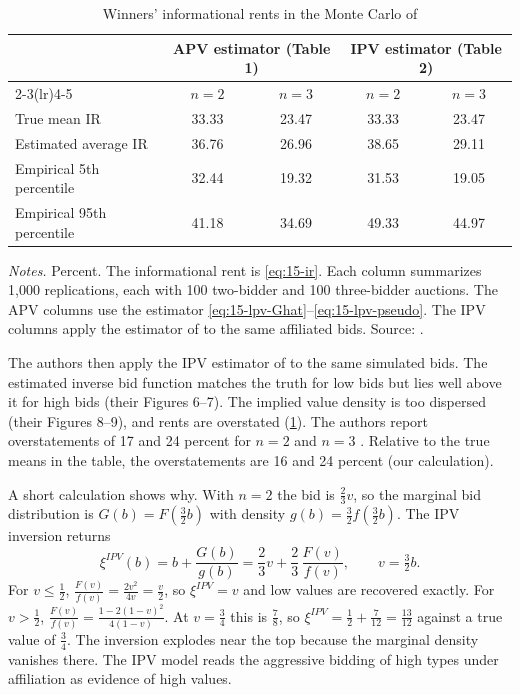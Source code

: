 \begin{table}[htbp]
\centering
\caption{Winners' informational rents in the Monte Carlo of \citet{LiPerrigneVuong2002}}\label{tab:15-lpv-rents}
\begin{tabular}{@{}lcccc@{}}
\toprule
 & \multicolumn{2}{c}{APV estimator (Table 1)} & \multicolumn{2}{c}{IPV estimator (Table 2)} \\
\cmidrule(lr){2-3}\cmidrule(lr){4-5}
 & $n=2$ & $n=3$ & $n=2$ & $n=3$ \\
\midrule
True mean IR & 33.33 & 23.47 & 33.33 & 23.47 \\
Estimated average IR & 36.76 & 26.96 & 38.65 & 29.11 \\
Empirical 5th percentile & 32.44 & 19.32 & 31.53 & 19.05 \\
Empirical 95th percentile & 41.18 & 34.69 & 49.33 & 44.97 \\
\bottomrule
\end{tabular}

\smallskip
\begin{minipage}{0.86\textwidth}
\footnotesize \textit{Notes.} Percent. The informational rent is \eqref{eq:15-ir}. Each column summarizes 1,000
replications, each with 100 two-bidder and 100 three-bidder auctions. The APV columns use the estimator
\eqref{eq:15-lpv-Ghat}--\eqref{eq:15-lpv-pseudo}. The IPV columns apply the estimator of
\citet{GuerrePerrigneVuong2000} to the same affiliated bids. Source: \citet[Tables~1 and~2]{LiPerrigneVuong2002}.
\end{minipage}
\end{table}

 The authors then apply the IPV estimator of
\citet{GuerrePerrigneVuong2000} to the same simulated bids. The estimated inverse bid function matches the
truth for low bids but lies well above it for high bids (their Figures 6--7). The implied value density is
too dispersed (their Figures 8--9), and rents are overstated (\cref{tab:15-lpv-rents}). The authors report
overstatements of 17 and 24 percent for $n=2$ and $n=3$ \citep[p.~186]{LiPerrigneVuong2002}. Relative to
the true means in the table, the overstatements are 16 and 24 percent (our calculation).

A short calculation shows why. With $n=2$ the bid is $\frac23v$, so the marginal bid distribution is
$G(b)=F(\frac32b)$ with density $g(b)=\frac32f(\frac32b)$. The IPV inversion returns
\begin{equation*}
  \xi^{IPV}(b)=b+\frac{G(b)}{g(b)}=\frac23v+\frac23\,\frac{F(v)}{f(v)},\qquad v=\tfrac32b .
\end{equation*}
For $v\le\frac12$, $\frac{F(v)}{f(v)}=\frac{2v^2}{4v}=\frac v2$, so $\xi^{IPV}=v$ and low values are
recovered exactly. For $v>\frac12$, $\frac{F(v)}{f(v)}=\frac{1-2(1-v)^2}{4(1-v)}$. At $v=\frac34$ this is
$\frac78$, so $\xi^{IPV}=\frac12+\frac{7}{12}=\frac{13}{12}$ against a true value of $\frac34$. The
inversion explodes near the top because the marginal density vanishes there. The IPV model reads the
aggressive bidding of high types under affiliation as evidence of high values.


